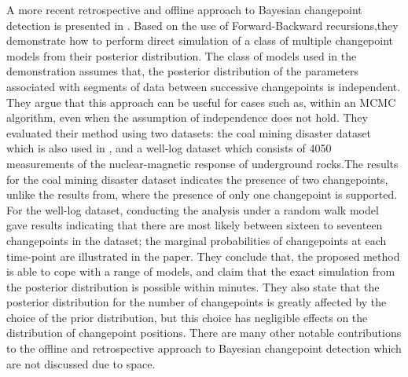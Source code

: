 \documentclass[13pt]{report}
\begin{document}
A more recent retrospective and offline approach to Bayesian changepoint detection is presented in \cite{fearnhead2006exact}. Based on the use of Forward-Backward recursions,they demonstrate how to perform direct simulation of a class of multiple changepoint models from their posterior distribution. The class of models used in the demonstration assumes that, the posterior distribution of the parameters associated with segments of data between successive changepoints is independent. They argue that this approach can be useful for cases such as, within an MCMC algorithm, even when the assumption of independence does not hold. They evaluated their method using two datasets: the coal mining disaster dataset which is also used in \cite{chib1998estimation}, and a well-log dataset which consists of 4050 measurements of the nuclear-magnetic response of underground rocks.The results for the coal mining disaster dataset indicates the presence of two changepoints, unlike the results from\cite{chib1998estimation}, where the presence of only one changepoint is supported. For the well-log dataset, conducting the analysis under a random walk model gave results indicating that there are most likely  between sixteen to seventeen changepoints in the dataset; the marginal probabilities of changepoints at each time-point are illustrated in the paper\cite{fearnhead2006exact}.
They conclude that, the proposed method is able to cope with a range of models, and claim that the exact simulation from the posterior distribution is possible within minutes\cite{fearnhead2006exact}. They also state that the posterior distribution for the number of changepoints is greatly affected by the choice of the prior distribution, but this choice has negligible effects on the distribution of changepoint positions\cite{fearnhead2006exact}. There are many other notable contributions \cite{green1995reversible, smith1975bayesian, barry1993bayesian} to the offline and retrospective approach to Bayesian changepoint detection which are not discussed due to space.
\end{document}
